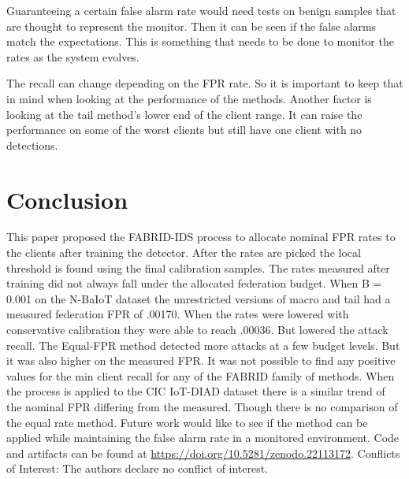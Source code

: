\documentclass[pdflatex,sn-mathphys-num]{sn-jnl}
\begin{document}
Guaranteeing a certain false alarm rate would need tests on benign samples that are thought to represent the monitor. Then it can be seen if the false alarms match the expectations. This is something that needs to be done to monitor the rates as the system evolves.

The recall can change depending on the FPR rate. So it is important to keep that in mind when looking at the performance of the methods. Another factor is looking at the tail method's lower end of the client range. It can raise the performance on some of the worst clients but still have one client with no detections.

\section{Conclusion}\label{sec:conclusion}
This paper proposed the FABRID-IDS process to allocate nominal FPR rates to the clients after training the detector. After the rates are picked the local threshold is found using the final calibration samples. The rates measured after training did not always fall under the allocated federation budget. When B = 0.001 on the N-BaIoT dataset the unrestricted versions of macro and tail had a measured federation FPR of .00170. When the rates were lowered with conservative calibration they were able to reach .00036. But lowered the attack recall. The Equal-FPR method detected more attacks at a few budget levels. But it was also higher on the measured FPR. It was not possible to find any positive values for the min client recall for any of the FABRID family of methods. When the process is applied to the CIC IoT-DIAD dataset there is a similar trend of the nominal FPR differing from the measured. Though there is no comparison of the equal rate method. Future work would like to see if the method can be applied while maintaining the false alarm rate in a monitored environment. Code and artifacts can be found at \url{https://doi.org/10.5281/zenodo.22113172}. Conflicts of Interest: The authors declare no conflict of interest.


\end{document}
